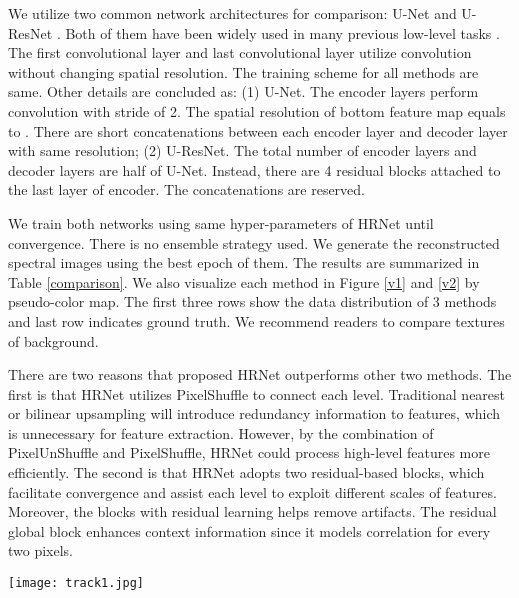 \documentclass[10pt,twocolumn,letterpaper]{article}
\begin{document}
We utilize two common network architectures for comparison: U-Net \cite{ronneberger2015u} and U-ResNet \cite{ronneberger2015u, he2016deep}. Both of them have been widely used in many previous low-level tasks \cite{isola2017image, iizuka2017globally, yu2019free, kupyn2018deblurgan, chen2018learning, zhao2019saliency}. The first convolutional layer and last convolutional layer utilize  convolution without changing spatial resolution. The training scheme for all methods are same. Other details are concluded as: (1) U-Net. The encoder layers perform convolution with stride of 2. The spatial resolution of bottom feature map equals to . There are short concatenations between each encoder layer and decoder layer with same resolution; (2) U-ResNet. The total number of encoder layers and decoder layers are half of U-Net. Instead, there are 4 residual blocks attached to the last layer of encoder. The concatenations are reserved.

We train both networks using same hyper-parameters of HRNet until convergence. There is no ensemble strategy used. We generate the reconstructed spectral images using the best epoch of them. The results are summarized in Table \ref{comparison}. We also visualize each method in Figure \ref{v1} and \ref{v2} by pseudo-color map. The first three rows show the data distribution of 3 methods and last row indicates ground truth. We recommend readers to compare textures of background.

There are two reasons that proposed HRNet outperforms other two methods. The first is that HRNet utilizes PixelShuffle to connect each level. Traditional nearest or bilinear upsampling will introduce redundancy information to features, which is unnecessary for feature extraction. However, by the combination of PixelUnShuffle and PixelShuffle, HRNet could process high-level features more efficiently. The second is that HRNet adopts two residual-based blocks, which facilitate convergence and assist each level to exploit different scales of features. Moreover, the blocks with residual learning helps remove artifacts. The residual global block enhances context information since it models correlation for every two pixels.

\begin{figure*}[t]
\centering
\texttt{[image: track1.jpg]}
\caption{Visualization of generated results from U-ResNet, U-Net, and proposed HRNet on NTIRE 2020 HS validation set track 1.}
\label{v1}
\end{figure*}
\end{document}
